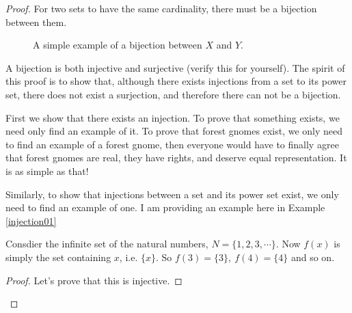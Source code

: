\begin{proof}
For two sets to have the same cardinality, there must be a bijection between them.  
\begin{figure}[ht]
\centering
{}
\caption{A simple example of a bijection between $X$ and $Y$.}
\end{figure}
A bijection is both injective and surjective (verify this for yourself).  The spirit of this proof is to show that, although there exists injections from a set to its power set, there does not exist a surjection, and therefore there can not be a bijection.

 First we show that there exists an injection.  To prove that something exists, we need only find an example of it.  To prove that forest gnomes exist, we only need to find an example of a forest gnome, then everyone would have to finally agree that forest gnomes are real, they have rights, and deserve equal representation.  It is as simple as that!

Similarly, to show that  injections between a set and its power set exist, we only need to find an example of one.  I am providing an example here in Example \ref{injection01}


\begin{example}[$f: X\mapsto Y$ such that for $x\in X, ~~f(x)  = \{x\}$.]
Consdier the infinite set of the natural numbers, $N = \{1,2,3,\cdots\}$.  Now $f(x)$ is simply the set containing $x$, i.e. $\{x \}$.  So $f(3) = \{3\}, ~f(4) = \{4\}$ and so on.  
\begin{proof}Let's prove that this is injective.


\end{proof}
\end{example}
\end{proof}
